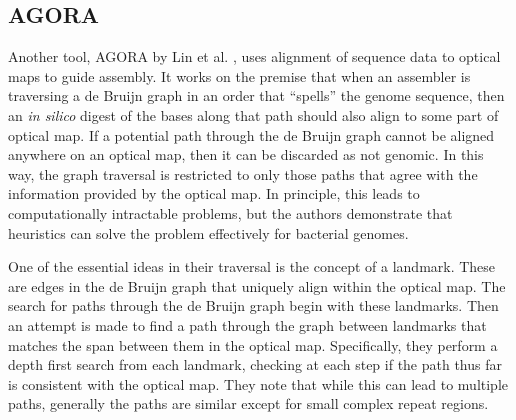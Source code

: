 

\subsection{AGORA}

Another tool, AGORA by Lin et al. \cite{lin2012agora}, uses alignment of sequence data to optical maps to guide assembly.
It works on the premise that when an assembler is traversing a de Bruijn graph in an order that “spells” the genome sequence, then an \emph{in silico} digest of the bases along that path should also align to some part of optical map.
If a potential path through the de Bruijn graph cannot be aligned anywhere on an optical map, then it can be discarded as not genomic.
In this way, the graph traversal is restricted to only those paths that agree with the information provided by the optical map.
In principle, this leads to computationally intractable problems, but the authors demonstrate that heuristics can solve the problem effectively for bacterial genomes.

One of the essential ideas in their traversal is the concept of a landmark.
These are edges in the de Bruijn graph that uniquely align within the optical map.
The search for paths through the de Bruijn graph begin with these landmarks.
Then an attempt is made to find a path through the graph between landmarks that matches the span between them in the optical map.
Specifically, they perform a depth first search from each landmark, checking at each step if the path thus far is consistent with the optical map.
They note that while this can lead to multiple paths, generally the paths are similar except for small complex repeat regions.


